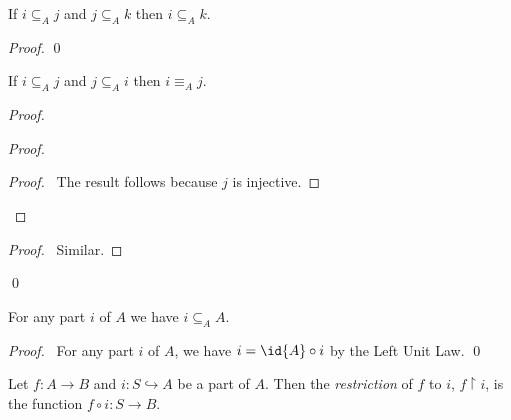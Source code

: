 \begin{prop}
  If $i \subseteq_A j$ and $j \subseteq_A k$ then $i \subseteq_A k$.
\end{prop}

\begin{proof}
  \pf
  \qed
\end{proof}

\begin{prop}
  If $i \subseteq_A j$ and $j \subseteq_A i$ then $i \equiv_A j$.
\end{prop}

\begin{proof}
  \pf
  \begin{proof}
    \qedstep
    \begin{proof}
      \pf\ The result follows because $j$ is injective.
    \end{proof}
  \end{proof}
  \begin{proof}
    \pf\ Similar.
  \end{proof}
  \qed
\end{proof}

\begin{prop}
  For any part $i$ of $A$ we have $i \subseteq_A A$.
\end{prop}

\begin{proof}
  \pf\ For any part $i$ of $A$, we have $i = \id{A} \circ i$ by the Left Unit Law. \qed
\end{proof}

\begin{df}[Restriction]
  Let $f : A \rightarrow B$ and $i : S \hookrightarrow A$ be a part of $A$. Then the \emph{restriction} of $f$ to $i$,
  $f \restriction i$, is the function $f \circ i : S \rightarrow B$.
\end{df}

